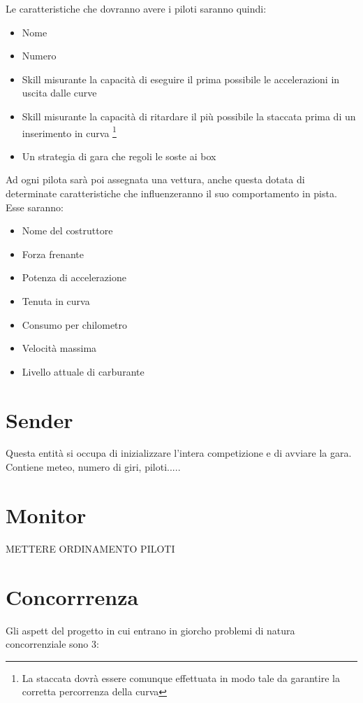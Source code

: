 \documentclass[a4paper,11pt, twoside]{book}
\begin{document}
      Le caratteristiche che dovranno avere i piloti saranno quindi:
	
	\begin{itemize}
	  \item Nome 
	  \item Numero
	  \item Skill misurante la capacità di eseguire il prima possibile le accelerazioni in uscita dalle curve
	  \item Skill misurante la capacità di ritardare il più possibile la staccata prima di un inserimento in curva 
		\footnote{La staccata dovrà essere comunque effettuata in modo tale da garantire la 
		corretta percorrenza della curva}
	  \item Un strategia di gara che regoli le soste ai box
	\end{itemize}
	
	
	Ad ogni pilota sarà poi assegnata una vettura, anche questa dotata di determinate caratteristiche che influenzeranno il suo
	comportamento in pista. Esse saranno:
	
	\begin{itemize}
	  \item Nome del costruttore
	  \item Forza frenante
	  \item Potenza di accelerazione
	  \item Tenuta in curva
	  \item Consumo per chilometro
	  \item Velocità massima
	  \item Livello attuale di carburante
	\end{itemize}
      
      

     
	
    \section{Sender}
      Questa entità si occupa di inizializzare l'intera competizione e di avviare la gara.
      Contiene meteo, numero di giri, piloti.....
      
    \section{Monitor}
      METTERE ORDINAMENTO PILOTI
  
    \section{Concorrrenza}
    \label{Concorenza}
      Gli aspett del progetto in cui entrano in giorcho problemi di natura concorrenziale sono 3:
      
\end{document}
